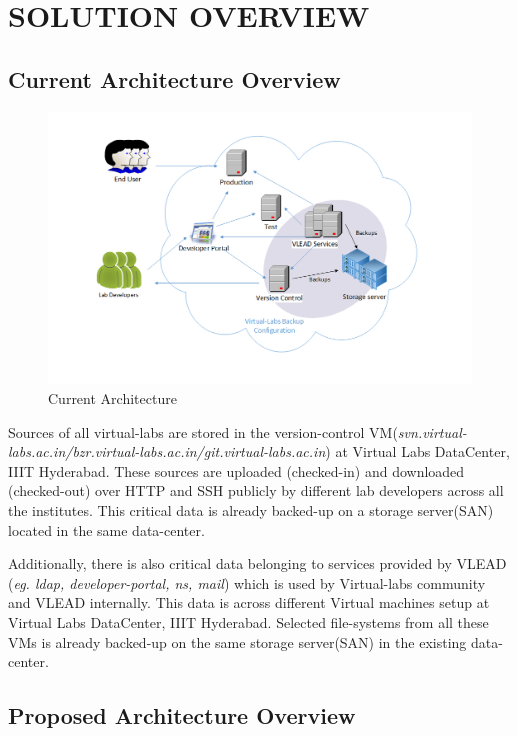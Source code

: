 \documentclass[11pt]{article}
\begin{document}
\section{SOLUTION OVERVIEW}
\label{sec-7}

\subsection{Current Architecture Overview}
\label{sec-7.1}


\begin{figure}[H]
\centering
\includegraphics[width=16cm]{Current-Backup-Model.png}
\caption{Current Architecture}
\end{figure}

    Sources of all virtual-labs are stored in the version-control
VM(\emph{svn.virtual-labs.ac.in/bzr.virtual-labs.ac.in/git.virtual-labs.ac.in})
at Virtual Labs DataCenter, IIIT Hyderabad. These sources are uploaded
(checked-in) and downloaded (checked-out) over HTTP and SSH publicly
by different lab developers across all the institutes. This critical
data is already backed-up on a storage server(SAN) located in the same
data-center.
  
  Additionally, there is also critical data belonging to services
provided by VLEAD (\emph{eg. ldap, developer-portal, ns, mail}) which is used
by Virtual-labs community and VLEAD internally. This data is across
different Virtual machines setup at Virtual Labs DataCenter, IIIT
Hyderabad. Selected file-systems from all these VMs is already
backed-up on the same storage server(SAN) in the existing data-center.
\subsection{Proposed Architecture Overview}
\label{sec-7.2}
\end{document}
